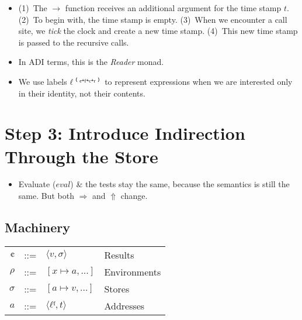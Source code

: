 \documentclass[12pt, oneside]{book}
\begin{document}
\begin{itemize}
  \item (1)~The \(→\) function receives an additional argument for the time stamp \(t\). (2)~To begin with, the time stamp is empty. (3)~When we encounter a call site, we \emph{tick} the clock and create a new time stamp. (4)~This new time stamp is passed to the recursive calls.
  \item In ADI terms, this is the \emph{Reader} monad.
  \item We use labels \(ℓ⁽ᵉ⁺ᶠ⁺ᶜ⁺ʳ⁾\) to represent expressions when we are interested only in their identity, not their contents.
\end{itemize}

\section{Step 3: Introduce Indirection Through the Store}

\begin{itemize}
  \item Evaluate (\(eval\)) \& the tests stay the same, because the semantics is still the same. But both \(⇒\) and \(⇑\) change.
\end{itemize}

\subsection{Machinery}

\begin{tabular}{rcll}
  \(¢\) & ::= & \(⟨v, σ⟩\)       & Results      \\
  \(ρ\) & ::= & \([x ↦ a, ...]\) & Environments \\
  \(σ\) & ::= & \([a ↦ v, ...]\) & Stores       \\
  \(a\) & ::= & \(⟨ℓᶠ, t⟩\)      & Addresses    \\
\end{tabular}
\end{document}

